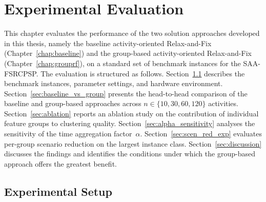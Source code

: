 \chapter{Experimental Evaluation}
\label{chap:experiments}
This chapter evaluates the performance of the two solution
approaches developed in this thesis, namely the baseline
activity-oriented Relax-and-Fix (Chapter~\ref{chap:baseline})
and the group-based activity-oriented Relax-and-Fix
(Chapter~\ref{chap:grouprf}), on a standard set of benchmark
instances for the SAA-FSRCPSP\@. The evaluation is structured as
follows. Section~\ref{sec:setup} describes the benchmark
instances, parameter settings, and hardware environment.
Section~\ref{sec:baseline_vs_group} presents the head-to-head
comparison of the baseline and group-based approaches across
$n \in \{10, 30, 60, 120\}$ activities.
Section~\ref{sec:ablation} reports an ablation study on the
contribution of individual feature groups to clustering quality.
Section~\ref{sec:alpha_sensitivity} analyses the sensitivity
of the time aggregation factor~$\alpha$.
Section~\ref{sec:scen_red_exp} evaluates per-group scenario
reduction on the largest instance class.
Section~\ref{sec:discussion} discusses the findings and
identifies the conditions under which the group-based approach
offers the greatest benefit.
\section{Experimental Setup}
\label{sec:setup}
